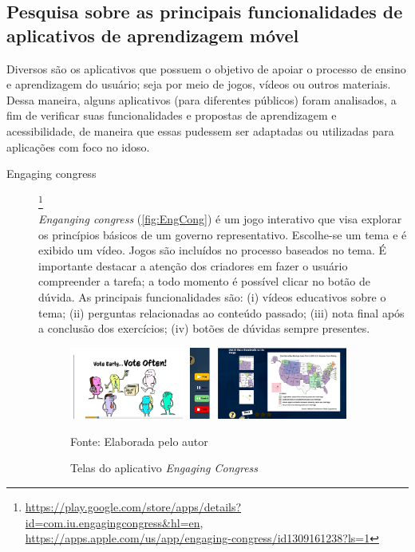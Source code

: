\subsection{Pesquisa sobre as principais funcionalidades de aplicativos de aprendizagem móvel}
Diversos são os aplicativos que possuem o objetivo de apoiar o processo de ensino e aprendizagem do usuário; seja por meio de jogos, vídeos ou outros materiais. Dessa maneira, alguns aplicativos (para diferentes públicos) foram analisados, a fim de verificar suas funcionalidades e propostas de aprendizagem e acessibilidade, de maneira que essas pudessem ser adaptadas ou utilizadas para aplicações com foco no idoso.

\begin{description}

\item[Engaging congress]\footnote{\url{https://play.google.com/store/apps/details?id=com.iu.engagingcongress&hl=en}, \url{https://apps.apple.com/us/app/engaging-congress/id1309161238?ls=1}} \hfill \\
\textit{Enganging congress} (\autoref{fig:EngCong}) é um jogo interativo que visa explorar os princípios básicos de um governo representativo. Escolhe-se um tema e é exibido um vídeo. Jogos são incluídos no processo baseados no tema. É importante destacar a atenção dos criadores em fazer o usuário compreender a tarefa; a todo momento é possível clicar no botão de dúvida. As principais funcionalidades são: (i) vídeos educativos sobre o tema; (ii) perguntas relacionadas ao conteúdo passado; (iii) nota final após a conclusão dos exercícios; (iv) botões de dúvidas sempre presentes.

\begin{figure}[ht!]
\centering
    \caption{Telas do aplicativo \textit{Engaging Congress}}
    \label{fig:EngCong}
    \includegraphics[width=0.9\textwidth]{Figuras/engagingcongress.png}
    
    Fonte: Elaborada pelo autor
\end{figure}


\end{description}
